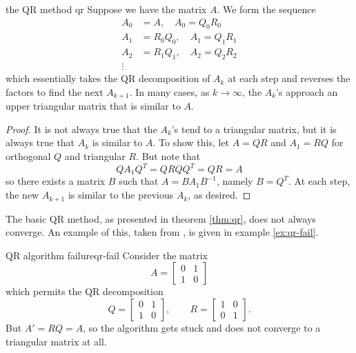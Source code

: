 \documentclass{article}
\begin{document}
\begin{theorem}{the QR method \cite[p.~530]{strang}}{qr}
  Suppose we have the matrix $A$. We form the sequence
  \begin{align*}
    A_0 &= A, \quad A_0 = Q_0R_0 \\
    A_1 &= R_0Q_0, \quad A_1 = Q_1R_1 \\
    A_2 &= R_1Q_1, \quad A_2 = Q_2R_2 \\
    \vdots
  \end{align*}
  which essentially takes the QR decomposition of $A_k$ at each step and reverses the factors to find the next $A_{k+1}$. In many cases, as $k \to \infty$, the $A_k$'s approach an upper triangular matrix that is similar to $A$.
\end{theorem}
\begin{proof}
  It is not always true that the $A_k$'s tend to a triangular matrix, but it is always true that $A_k$ is similar to $A$. To show this, let $A = QR$ and $A_1 = RQ$ for orthogonal $Q$ and triangular $R$. But note that
  \begin{equation*}
    QA_1Q^T = QRQQ^T = QR = A
  \end{equation*}
  so there exists a matrix $B$ such that $A = BA_1B^{-1}$, namely $B = Q^T$. At each step, the new $A_{k+1}$ is similar to the previous $A_k$, as desired.
\end{proof}

The basic QR method, as presented in theorem \ref{thm:qr}, does not always converge. An example of this, taken from \cite{cornell-qr}, is given in example \ref{ex:qr-fail}.

\begin{example}{QR algorithm failure}{qr-fail}
  Consider the matrix
  \begin{equation*}
    A = \begin{bmatrix}0 & 1 \\ 1 & 0\end{bmatrix}
  \end{equation*}
  which permits the QR decomposition
  \begin{equation*}
    Q = \begin{bmatrix}0 & 1 \\ 1 & 0\end{bmatrix}, \quad\quad
    R = \begin{bmatrix}1 & 0 \\ 0 & 1\end{bmatrix}.
  \end{equation*}
  But $A' = RQ = A$, so the algorithm gets stuck and does not converge to a triangular matrix at all.
\end{example}
\end{document}
